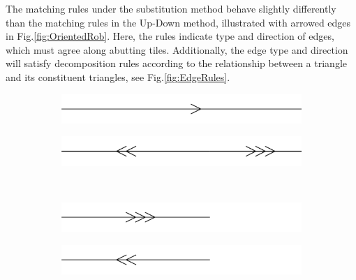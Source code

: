 \documentclass[
  oneside,
  11pt, a4paper,
  footinclude=true,
  headinclude=true,
  cleardoublepage=empty
]{scrbook}
\begin{document}
The matching rules under the substitution method behave slightly differently than the matching rules in the Up-Down method, illustrated with arrowed edges in Fig.\ref{fig:OrientedRob}. Here, the rules indicate type and direction of edges, which must agree along abutting tiles. Additionally, the edge type and direction will satisfy decomposition rules according to the relationship between a triangle and its constituent triangles, see Fig.\ref{fig:EdgeRules}. 
\begin{figure}[H]
        \begin{subfigure}[t]{0.4\textwidth}
                \includegraphics[width=\textwidth]{a1}
        \end{subfigure}\hfill
        \begin{subfigure}[t]{0.4\textwidth}
                \includegraphics[width=\textwidth]{a1inflate}
        \end{subfigure}\\
        
        \begin{subfigure}[t]{0.4\textwidth}
                \includegraphics[width=\textwidth]{a2}
        \end{subfigure}\hfill
        \begin{subfigure}[t]{0.4\textwidth}
                \includegraphics[width=\textwidth]{a2inflate}
        \end{subfigure}\\    
        

\end{figure}
\end{document}
